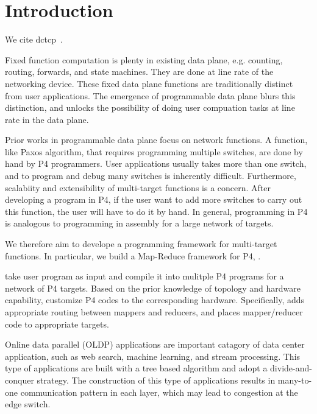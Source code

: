 \section{Introduction}
We cite dctcp~\cite{dctcp}.

Fixed function computation is plenty in existing data plane, e.g. counting, routing, forwards, and state machines. 
They are done at line rate of the networking device. 
These fixed data plane functions are traditionally distinct from user applications. 
The emergence of programmable data plane blurs this distinction, and unlocks the possibility of doing user compuation tasks at line rate in the data plane.

Prior works in programmable data plane focus on network functions. A function, like Paxos algorithm, that requires programming multiple switches, are done by hand by P4 programmers. User applications usually takes more than one switch, and to program and debug many switches is inherently difficult. Furthermore, scalabiity and extensibility of multi-target functions is a concern. After developing a program in P4, if the user want to add more switches to carry out this function, the user will have to do it by hand. In general, programming in P4 is analogous to programming in assembly for a large network of targets.

We therefore aim to develope a programming framework for multi-target functions. In particular, we build a Map-Reduce framework for P4, \sys. 

\sys take user program as input and compile it into mulitple P4 programs for a network of P4 targets. 
Based on the prior knowledge of topology and hardware capability, \sys customize P4 codes to the corresponding hardware.
Specifically, \sys adds appropriate routing between mappers and reducers, and  places mapper/reducer code to appropriate targets.

Online data parallel (OLDP) applications are important catagory of data center application, such as web search, machine learning, and stream processing. 
This type of applications are built with a tree based algorithm and adopt a divide-and-conquer strategy. 
The construction of this type of applications results in many-to-one communication pattern in each layer, which may lead to congestion at the edge switch.
